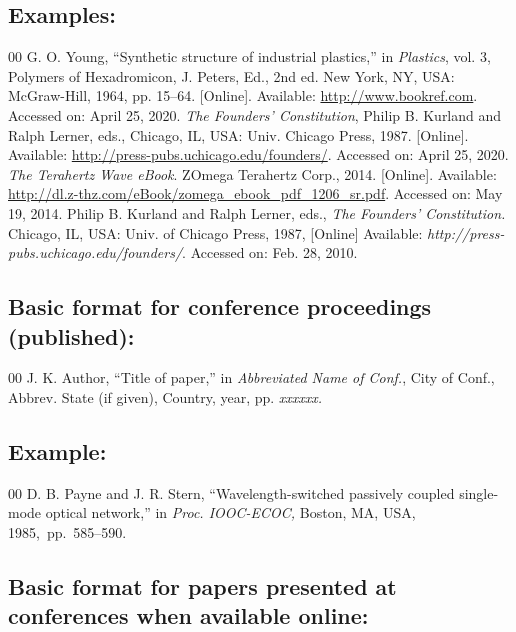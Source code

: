 \documentclass{IEEEtran}
\begin{document}
\subsection*{Examples:}

\begin{thebibliography}{00}
 G. O. Young, ``Synthetic structure of industrial
plastics,'' in \emph{Plastics}, vol. 3, Polymers of Hexadromicon, J.
Peters, Ed., 2nd ed. New York, NY, USA: McGraw-Hill, 1964, pp. 15--64.
[Online]. Available: \underline{http://www.bookref.com}. Accessed on: April 25, 2020.
 \textit{The Founders' Constitution}, Philip B. Kurland and Ralph Lerner, eds., Chicago, IL, USA: Univ. Chicago Press, 1987. [Online]. Available: \underline {http://press-pubs.uchicago.edu/founders/}. Accessed on: April 25, 2020.
 \emph{The Terahertz Wave eBook}. ZOmega Terahertz
Corp., 2014. [Online]. Available: \underline{http://dl.z-thz.com/eBook/zomega\_ebook\_pdf\_1206\_sr.pdf}. Accessed on: May 19, 2014.
 Philip B. Kurland and Ralph Lerner, eds., \textit{The
Founders' Constitution. }Chicago, IL, USA: Univ. of Chicago Press, 1987, [Online] Available: \emph{http://press-pubs.uchicago.edu/founders/}. Accessed on: Feb. 28, 2010.
\end{thebibliography}

\subsection*{Basic format for conference proceedings (published):}

\begin{thebibliography}{00}
 J. K. Author, ``Title of paper,'' in \textit{Abbreviated Name of Conf.}, City of Conf., Abbrev. State (if
given), Country, year, pp. \textit{xxxxxx.}
\end{thebibliography}

\subsection*{Example:}

\begin{thebibliography}{00}
 D. B. Payne and J. R. Stern, ``Wavelength-switched
passively coupled single-mode optical network,'' in \textit{Proc. IOOC-ECOC, }Boston, MA, USA, 1985,~pp.~585--590.
\end{thebibliography}

\subsection*{Basic format for papers presented at conferences when available online: }
\end{document}
